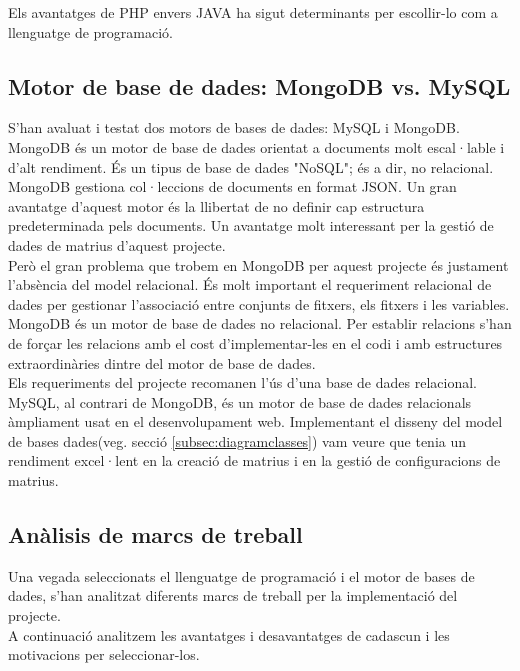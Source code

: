 Els avantatges de PHP envers JAVA ha sigut determinants per escollir-lo com a llenguatge de programació.

\subsection{Motor de base de dades: MongoDB vs. MySQL}
S'han avaluat i testat dos motors de bases de dades: MySQL i MongoDB.\\

MongoDB \'{e}s un motor de base de dades orientat a documents molt escal·lable i d'alt rendiment.\cite{mongodb} \'{E}s un tipus de base de dades "NoSQL"; \'{e}s a dir, no relacional.\cite{nosql} MongoDB gestiona col·leccions de documents en format JSON.\cite{apijson} Un gran avantatge d'aquest motor \'{e}s la llibertat de no definir cap estructura predeterminada pels documents. Un avantatge molt interessant per la gestió de dades de matrius d'aquest projecte.\\

Però el gran problema que trobem en MongoDB per aquest projecte \'{e}s justament l'absència del model relacional. \'{E}s molt important el requeriment relacional de dades per gestionar l'associació entre conjunts de fitxers, els fitxers i les variables. MongoDB \'{e}s un motor de base de dades no relacional. Per establir relacions s'han de forçar les relacions amb el cost d'implementar-les en el codi i amb estructures extraordinàries dintre del motor de base de dades.\\

Els requeriments del projecte recomanen l'\'{u}s d'una base de dades relacional. MySQL, al contrari de MongoDB, \'{e}s un motor de base de dades relacionals àmpliament usat en el desenvolupament web. Implementant el disseny del model de bases dades(veg. secció \ref{subsec:diagramclasses}) vam veure que tenia un rendiment excel·lent en la creació de matrius i en la gestió de configuracions de matrius.

\subsection{Anàlisis de marcs de treball}
Una vegada seleccionats el llenguatge de programació i el motor de bases de dades, s'han analitzat diferents marcs de treball per la implementació del projecte.\\

A continuació analitzem les avantatges i desavantatges de cadascun i les motivacions per seleccionar-los.

